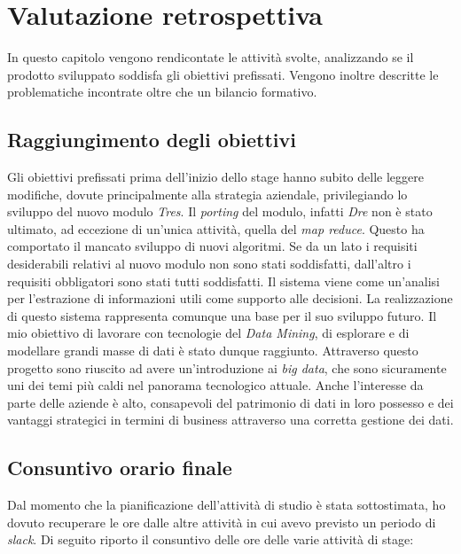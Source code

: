 
\chapter{Valutazione retrospettiva}
\label{cap:conclusioni}
In questo capitolo vengono rendicontate le attività svolte, analizzando se il prodotto sviluppato soddisfa gli obiettivi prefissati. Vengono inoltre descritte le problematiche incontrate oltre che un bilancio formativo.


\section{Raggiungimento degli obiettivi}
Gli obiettivi prefissati prima dell'inizio dello stage hanno subito delle leggere modifiche, dovute principalmente alla strategia aziendale, privilegiando lo sviluppo del nuovo modulo \textit{Tres}. Il \textit{porting} del modulo, infatti \textit{Dre} non è stato ultimato, ad eccezione di un'unica attività, quella del \textit{map reduce}. Questo ha comportato il mancato sviluppo di nuovi algoritmi. Se da un lato i requisiti desiderabili relativi al nuovo modulo non sono stati soddisfatti, dall'altro i requisiti obbligatori sono stati tutti soddisfatti. Il sistema viene come un'analisi per l'estrazione di informazioni utili come supporto alle decisioni. La realizzazione di questo sistema  rappresenta comunque una base per il suo sviluppo futuro. 
Il mio obiettivo di lavorare con tecnologie del \textit{Data Mining}, di esplorare e di modellare grandi masse di dati è stato dunque raggiunto. Attraverso questo progetto sono riuscito ad avere un'introduzione ai \textit{big data}, che sono sicuramente uni dei temi più caldi nel panorama tecnologico attuale. Anche l'interesse da parte delle aziende è alto, consapevoli del patrimonio di dati in loro possesso e dei vantaggi strategici in termini di business attraverso una corretta gestione dei dati. \\
\section{Consuntivo orario finale}
Dal momento che la pianificazione dell'attività di studio è stata sottostimata, ho dovuto recuperare le ore dalle altre attività in cui avevo previsto un periodo di \textit{slack}. Di seguito riporto il consuntivo delle ore delle varie attività di stage:

